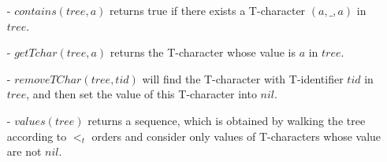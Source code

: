 \begin{itemize}
\setlength{\itemsep}{0.5pt}
\item[-] $contains(tree,a)$ returns true if there exists a T-character $(a,\_,a)$ in $tree$.


\item[-] $getTchar(tree,a)$ returns the T-character whose value is $a$ in $tree$.

\item[-] $removeTChar(tree,tid)$ will find the T-character with T-identifier $tid$ in $tree$, and then set the value of this T-character into $nil$.

\item[-] $values(tree)$ returns a sequence, which is obtained by walking the tree according to $<_t$ orders and consider only values of T-characters whose value are not $nil$.
\end{itemize}





